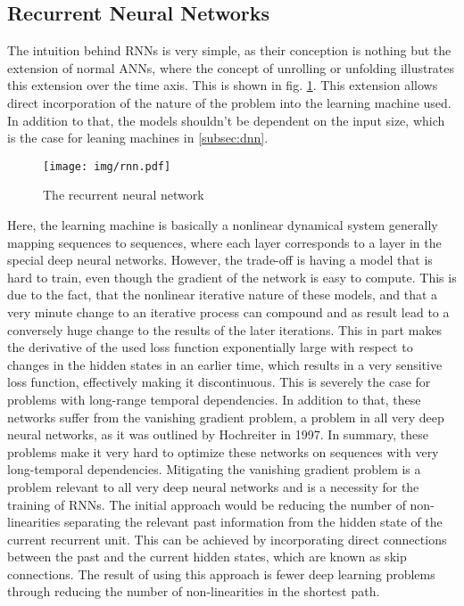 		\subsection{Recurrent Neural Networks}\label{subsec:rnns}
			The intuition behind RNNs is very simple, as their conception is nothing but the extension of normal ANNs, where the concept of unrolling or unfolding illustrates this extension over the time axis. This is shown in fig. \ref{fig:rnn}. This extension allows direct incorporation of the nature of the problem into the learning machine used. In addition to that, the models shouldn't be dependent on the input size, which is the case for leaning machines in \ref{subsec:dnn}.
			\begin{figure}[H]
				\centering
				\texttt{[image: img/rnn.pdf]}
				\caption{The recurrent neural network}
				\label{fig:rnn}
			\end{figure}
			 Here, the learning machine is basically a nonlinear dynamical system generally mapping sequences to sequences, where each layer corresponds to a layer in the special deep neural networks.\newline
			However, the trade-off is having a model that is hard to train, even though the gradient of the network is easy to compute. This is due to the fact, that the nonlinear iterative nature of these models, and that a very minute change to an iterative process can compound and as result lead to a conversely huge change to the results of the later iterations. This in part makes the derivative of the used loss function exponentially large with respect to changes in the hidden states in an earlier time, which results in a very sensitive loss function, effectively making it discontinuous. This is severely the case for problems with long-range temporal dependencies\cite{sutskever2013training}. In addition to that, these networks suffer from the vanishing gradient problem, a problem in all very deep neural networks, as it was outlined by Hochreiter in 1997\cite{hochreiter1997long}. In summary, these problems make it very hard to optimize these networks on sequences with very long-temporal dependencies.\newline
			Mitigating the vanishing gradient problem is a problem relevant to all very deep neural networks and is a necessity for the training of RNNs. The initial approach would be reducing the number of non-linearities separating the relevant past information from the hidden state of the current recurrent unit. This can be achieved by incorporating direct connections between the past and the current hidden states, which are known as skip connections. The result of using this approach is fewer deep learning problems through reducing the number of non-linearities in the shortest path\cite{hochreiter1997long}.\newline
